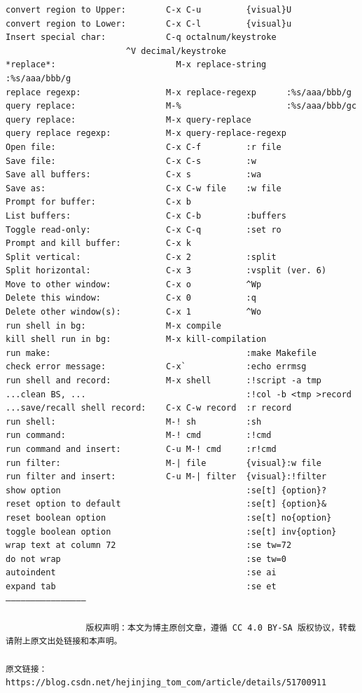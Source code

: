 \documentclass[11pt]{article}
\begin{document}
\begin{verbatim}
convert region to Upper:        C-x C-u         {visual}U
convert region to Lower:        C-x C-l         {visual}u
Insert special char:            C-q octalnum/keystroke
						^V decimal/keystroke
*replace*:                        M-x replace-string      :%s/aaa/bbb/g
replace regexp:                 M-x replace-regexp      :%s/aaa/bbb/g
query replace:                  M-%                     :%s/aaa/bbb/gc
query replace:                  M-x query-replace
query replace regexp:           M-x query-replace-regexp
Open file:                      C-x C-f         :r file
Save file:                      C-x C-s         :w
Save all buffers:               C-x s           :wa
Save as:                        C-x C-w file    :w file
Prompt for buffer:              C-x b
List buffers:                   C-x C-b         :buffers
Toggle read-only:               C-x C-q         :set ro
Prompt and kill buffer:         C-x k
Split vertical:                 C-x 2           :split
Split horizontal:               C-x 3           :vsplit (ver. 6)
Move to other window:           C-x o           ^Wp
Delete this window:             C-x 0           :q
Delete other window(s):         C-x 1           ^Wo
run shell in bg:                M-x compile
kill shell run in bg:           M-x kill-compilation
run make:                                       :make Makefile
check error message:            C-x`            :echo errmsg
run shell and record:           M-x shell       :!script -a tmp
...clean BS, ...                                :!col -b <tmp >record
...save/recall shell record:    C-x C-w record  :r record
run shell:                      M-! sh          :sh
run command:                    M-! cmd         :!cmd
run command and insert:         C-u M-! cmd     :r!cmd
run filter:                     M-| file        {visual}:w file
run filter and insert:          C-u M-| filter  {visual}:!filter
show option                                     :se[t] {option}?
reset option to default                         :se[t] {option}&
reset boolean option                            :se[t] no{option}
toggle boolean option                           :se[t] inv{option}
wrap text at column 72                          :se tw=72
do not wrap                                     :se tw=0
autoindent                                      :se ai
expand tab                                      :se et
————————————————

			    版权声明：本文为博主原创文章，遵循 CC 4.0 BY-SA 版权协议，转载请附上原文出处链接和本声明。
			
原文链接：https://blog.csdn.net/hejinjing_tom_com/article/details/51700911
\end{verbatim}
\end{document}
